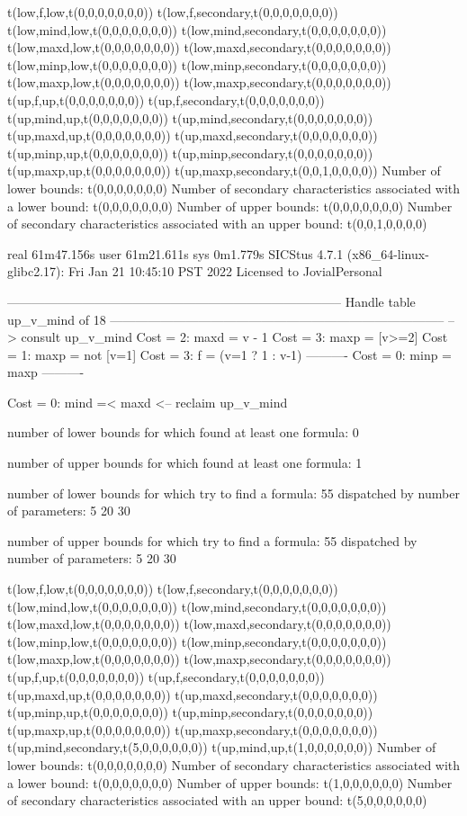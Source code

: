 t(low,f,low,t(0,0,0,0,0,0,0))
t(low,f,secondary,t(0,0,0,0,0,0,0))
t(low,mind,low,t(0,0,0,0,0,0,0))
t(low,mind,secondary,t(0,0,0,0,0,0,0))
t(low,maxd,low,t(0,0,0,0,0,0,0))
t(low,maxd,secondary,t(0,0,0,0,0,0,0))
t(low,minp,low,t(0,0,0,0,0,0,0))
t(low,minp,secondary,t(0,0,0,0,0,0,0))
t(low,maxp,low,t(0,0,0,0,0,0,0))
t(low,maxp,secondary,t(0,0,0,0,0,0,0))
t(up,f,up,t(0,0,0,0,0,0,0))
t(up,f,secondary,t(0,0,0,0,0,0,0))
t(up,mind,up,t(0,0,0,0,0,0,0))
t(up,mind,secondary,t(0,0,0,0,0,0,0))
t(up,maxd,up,t(0,0,0,0,0,0,0))
t(up,maxd,secondary,t(0,0,0,0,0,0,0))
t(up,minp,up,t(0,0,0,0,0,0,0))
t(up,minp,secondary,t(0,0,0,0,0,0,0))
t(up,maxp,up,t(0,0,0,0,0,0,0))
t(up,maxp,secondary,t(0,0,1,0,0,0,0))
Number of lower bounds:                                             t(0,0,0,0,0,0,0)
Number of secondary characteristics associated with a lower bound:  t(0,0,0,0,0,0,0)
Number of upper bounds:                                             t(0,0,0,0,0,0,0)
Number of secondary characteristics associated with an upper bound: t(0,0,1,0,0,0,0)

real	61m47.156s
user	61m21.611s
sys	0m1.779s
SICStus 4.7.1 (x86_64-linux-glibc2.17): Fri Jan 21 10:45:10 PST 2022
Licensed to JovialPersonal


--------------------------------------------------------------------------------
Handle table up_v_mind of 18
--------------------------------------------------------------------------------
--> consult up_v_mind
Cost =  2:  maxd = v - 1
Cost =  3:  maxp = [v>=2]
Cost =  1:  maxp = not [v=1]
Cost =  3:  f    = (v=1 ? 1 : v-1)
----------
Cost =  0:  minp = maxp
----------

Cost =  0:  mind =< maxd
<-- reclaim up_v_mind

number of lower bounds for which found at least one formula: 0

number of upper bounds for which found at least one formula: 1

number of lower bounds for which try to find a formula: 55
dispatched by number of parameters: 5  20  30

number of upper bounds for which try to find a formula: 55
dispatched by number of parameters: 5  20  30

t(low,f,low,t(0,0,0,0,0,0,0))
t(low,f,secondary,t(0,0,0,0,0,0,0))
t(low,mind,low,t(0,0,0,0,0,0,0))
t(low,mind,secondary,t(0,0,0,0,0,0,0))
t(low,maxd,low,t(0,0,0,0,0,0,0))
t(low,maxd,secondary,t(0,0,0,0,0,0,0))
t(low,minp,low,t(0,0,0,0,0,0,0))
t(low,minp,secondary,t(0,0,0,0,0,0,0))
t(low,maxp,low,t(0,0,0,0,0,0,0))
t(low,maxp,secondary,t(0,0,0,0,0,0,0))
t(up,f,up,t(0,0,0,0,0,0,0))
t(up,f,secondary,t(0,0,0,0,0,0,0))
t(up,maxd,up,t(0,0,0,0,0,0,0))
t(up,maxd,secondary,t(0,0,0,0,0,0,0))
t(up,minp,up,t(0,0,0,0,0,0,0))
t(up,minp,secondary,t(0,0,0,0,0,0,0))
t(up,maxp,up,t(0,0,0,0,0,0,0))
t(up,maxp,secondary,t(0,0,0,0,0,0,0))
t(up,mind,secondary,t(5,0,0,0,0,0,0))
t(up,mind,up,t(1,0,0,0,0,0,0))
Number of lower bounds:                                             t(0,0,0,0,0,0,0)
Number of secondary characteristics associated with a lower bound:  t(0,0,0,0,0,0,0)
Number of upper bounds:                                             t(1,0,0,0,0,0,0)
Number of secondary characteristics associated with an upper bound: t(5,0,0,0,0,0,0)


